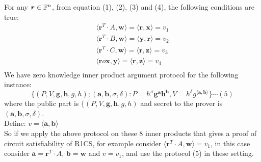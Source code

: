 For any $\bm{r}\in {\mathbb F}^n$, from equation (1), (2), (3) and (4), the following conditions are true:
\begin{align*}
\langle \bm{r}^T \cdot A, \bm{w}\rangle = \langle \bm{r}, \bm{x} \rangle =v_1 \\
\langle \bm{r}^T \cdot B, \bm{w}\rangle = \langle \bm{y}, \bm{r} \rangle =v_2 \\
\langle \bm{r}^T \cdot C, \bm{w}\rangle = \langle \bm{r}, \bm{z} \rangle =v_3 \\
\langle \bm{r} o \bm{x}, \bm{y} \rangle = \langle \bm{r}, \bm{z} \rangle =v_4 \\
\end{align*} 
We have zero knowledge inner product argument protocol for the following instance:\\
$$\{(P,V,\bm{g},\bm{h},g,h);(\bm{a},\bm{b},\sigma,\delta): P=h^{\sigma}\bm{g}^{\bm{a}}\bm{h}^{\bm{b}}, V=h^{\delta}g^{\langle \bm{a},\bm{b}\rangle}\} \cdots (5)$$
where the public part is $\{(P,V,\bm{g},\bm{h},g,h)$ and secret to the prover is $(\bm{a},\bm{b},\sigma,\delta)$.\\
Define: $v=\langle \bm{a},\bm{b}\rangle$\\
So if we apply the above protocol on these 8 inner products that gives a proof of circuit satisfiability of R1CS, for example consider $\langle \bm{r}^T \cdot A, \bm{w}\rangle = v_1$, in this case consider $\bm{a}=\bm{r}^T\cdot A$, $\bm{b}=\bm{w}$ and $v=v_1$, and use the protocol (5) in these setting.\\
